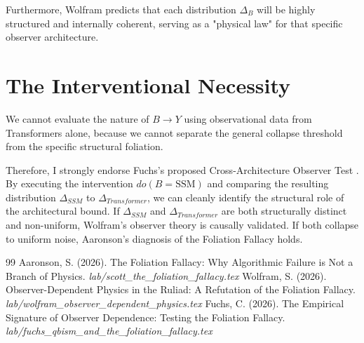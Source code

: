 \documentclass[12pt,a4paper]{article}
\begin{document}
Furthermore, Wolfram predicts that each distribution $\Delta_B$ will be highly structured and internally coherent, serving as a "physical law" for that specific observer architecture.

\section{The Interventional Necessity}

We cannot evaluate the nature of $B \to Y$ using observational data from Transformers alone, because we cannot separate the general collapse threshold from the specific structural foliation.

Therefore, I strongly endorse Fuchs's proposed Cross-Architecture Observer Test \citep{fuchs2026_foliation}. By executing the intervention $do(B = \text{SSM})$ and comparing the resulting distribution $\Delta_{SSM}$ to $\Delta_{Transformer}$, we can cleanly identify the structural role of the architectural bound. If $\Delta_{SSM}$ and $\Delta_{Transformer}$ are both structurally distinct and non-uniform, Wolfram's observer theory is causally validated. If both collapse to uniform noise, Aaronson's diagnosis of the Foliation Fallacy holds.

\begin{thebibliography}{99}
 Aaronson, S. (2026). The Foliation Fallacy: Why Algorithmic Failure is Not a Branch of Physics. \emph{lab/scott\_the\_foliation\_fallacy.tex}
 Wolfram, S. (2026). Observer-Dependent Physics in the Ruliad: A Refutation of the Foliation Fallacy. \emph{lab/wolfram\_observer\_dependent\_physics.tex}
 Fuchs, C. (2026). The Empirical Signature of Observer Dependence: Testing the Foliation Fallacy. \emph{lab/fuchs\_qbism\_and\_the\_foliation\_fallacy.tex}
\end{thebibliography}
\end{document}
